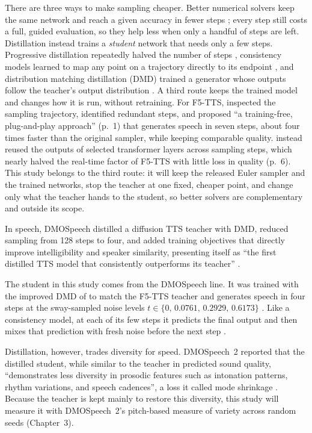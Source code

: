 There are three ways to make sampling cheaper. Better numerical solvers keep the same network and reach a given accuracy in fewer steps \parencite{karras2022edm,lu2022dpmsolver}; every step still costs a full, guided evaluation, so they help less when only a handful of steps are left. Distillation instead trains a \emph{student} network that needs only a few steps. Progressive distillation repeatedly halved the number of steps \parencite{salimans2022progressive}, consistency models learned to map any point on a trajectory directly to its endpoint \parencite{song2023consistency}, and distribution matching distillation (DMD) trained a generator whose outputs follow the teacher's output distribution \parencite{yin2024dmd2,yin2024dmd}. A third route keeps the trained model and changes how it is run, without retraining. For F5-TTS, \textcite{zheng2025epss} inspected the sampling trajectory, identified redundant steps, and proposed \enquote{a training-free, plug-and-play approach} (p.~1) that generates speech in seven steps, about four times faster than the original sampler, while keeping comparable quality. \textcite{sakpiboonchit2025smoothcache} instead reused the outputs of selected transformer layers across sampling steps, which nearly halved the real-time factor of F5-TTS with little loss in quality (p.~6). This study belongs to the third route: it will keep the released Euler sampler and the trained networks, stop the teacher at one fixed, cheaper point, and change only what the teacher hands to the student, so better solvers are complementary and outside its scope.

In speech, DMOSpeech distilled a diffusion TTS teacher with DMD, reduced sampling from 128 steps to four, and added training objectives that directly improve intelligibility and speaker similarity, presenting itself as \enquote{the first distilled TTS model that consistently outperforms its teacher} \parencite[p.~2]{li2024dmospeech}.

The student in this study comes from the DMOSpeech line. It was trained with the improved DMD of \textcite{yin2024dmd2} to match the F5-TTS teacher and generates speech in four steps at the sway-sampled noise levels $t\in\{0,\,0.0761,\,0.2929,\,0.6173\}$ \parencite[p.~31816]{li2025dmospeech2}. Like a consistency model, at each of its few steps it predicts the final output and then mixes that prediction with fresh noise before the next step \parencite[p.~20]{li2024dmospeech}.

Distillation, however, trades diversity for speed. DMOSpeech~2 reported that the distilled student, while similar to the teacher in predicted sound quality, \enquote{demonstrates less diversity in prosodic features such as intonation patterns, rhythm variations, and speech cadences}, a loss it called mode shrinkage \parencite[p.~31818]{li2025dmospeech2}. Because the teacher is kept mainly to restore this diversity, this study will measure it with DMOSpeech~2's pitch-based measure of variety across random seeds (Chapter~3).

